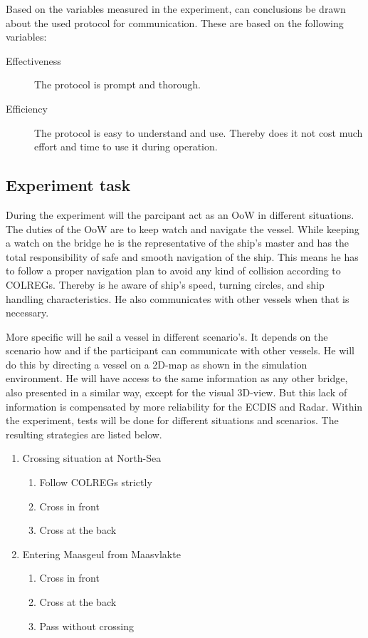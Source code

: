 Based on the variables measured in the experiment, can conclusions be drawn about the used protocol for communication. These are based on the following variables:
\begin{description}
	\item [Effectiveness] The protocol is prompt and thorough.
	\item [Efficiency] The protocol is easy to understand and use. Thereby does it not cost much effort and time to use it during operation.
\end{description}

\subsection{Experiment task}
\label{ssec:experiment-task}
During the experiment will the parcipant act as an \acf{OoW} in different situations. The duties of the \ac{OoW} are to keep watch and navigate the vessel. While keeping a watch on the bridge he is the representative of the ship’s master and has the total responsibility of safe and smooth navigation of the ship. This means he has to follow a proper navigation plan to avoid any kind of collision according to COLREGs. Thereby is he aware of ship’s speed, turning circles, and ship handling characteristics. He also communicates with other vessels when that is necessary.

More specific will he sail a vessel in different scenario's. It depends on the scenario how and if the participant can communicate with other vessels. He will do this by directing a vessel on a 2D-map as shown in the simulation environment. He will have access to the same information as any other bridge, also presented in a similar way, except for the visual 3D-view. But this lack of information is compensated by more reliability for the ECDIS and Radar.
Within the experiment, tests will be done for different situations and scenarios. The resulting strategies are listed below.
\begin{multicols}{2}
\begin{enumerate}
	\item Crossing situation at North-Sea
	\begin{enumerate}[label=(\Alph*)]
		\item Follow COLREGs strictly
		\item Cross in front
		\item Cross at the back
	\end{enumerate}
	\item Entering Maasgeul from Maasvlakte
	\begin{enumerate}[label=(\Alph*)]
		\item Cross in front
		\item Cross at the back
		\item Pass without crossing
	\end{enumerate}
\end{enumerate}
\end{multicols}

